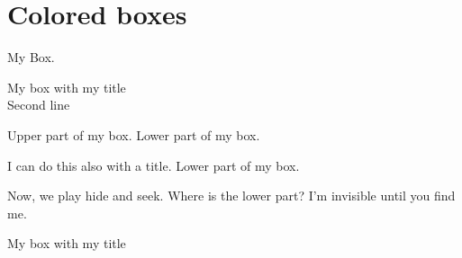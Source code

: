 \documentclass[]{article}
\begin{document}
	
	\section{Colored boxes}
	
	\begin{linenumbers}
		
	\begin{tcolorbox}[colback=red!5!white,colframe=red!75!white]
		My Box.
	\end{tcolorbox}
	
	\begin{tcolorbox}[colback=blue!5!white,colframe=blue!75!black, title=My title]
		My box with my title\\
		Second line
	\end{tcolorbox}
	
	\begin{tcolorbox}[colback=green!5!white,colframe=green!75!black]
		Upper part of my box.
		\tcblower
		Lower part of my box.
	\end{tcolorbox}
	
	\begin{tcolorbox}[colback=yellow!5!white,colframe=yellow!50!black,
		colbacktitle=yellow!75!black,title=My title]
		I can do this also with a title.
		\tcblower
		Lower part of my box.
	\end{tcolorbox}
	
	\begin{tcolorbox}[colback=yellow!10!white,colframe=red!75!black,lowerbox=invisible,savelowerto=\jobname_ex.tex]
		Now, we play hide and seek. Where is the lower part?
		\tcblower
		I'm invisible until you find me.
	\end{tcolorbox}
	
	\begin{tcolorbox}[colback=yellow!10!white,colframe=red!75!black,title=Here I am]
		
	\end{tcolorbox}
	
	\begin{tcolorbox}
		My box with my title
	\end{tcolorbox}
	
	\end{linenumbers}
	
\end{document}

